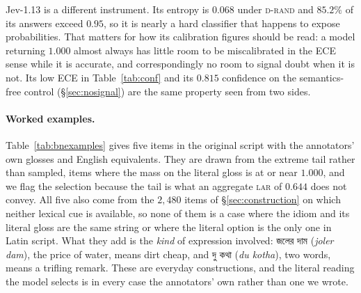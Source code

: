 \documentclass[11pt]{article}
\newcommand{\bangla}[1]{{\bn #1}}
\newcommand{\Drand}{\textsc{d-rand}}
\newcommand{\LAR}{\textsc{lar}}
\begin{document}
Jev-1.13 is a different instrument. Its entropy is $0.068$ under \Drand{} and
$85.2\%$ of its answers exceed $0.95$, so it is nearly a hard classifier that
happens to expose probabilities. That matters for how its calibration figures
should be read: a model returning $1.000$ almost always has little room to be
miscalibrated in the ECE sense while it is accurate, and correspondingly no room
to signal doubt when it is not. Its low ECE in Table~\ref{tab:conf} and its $0.815$
confidence on the semantics-free control (\S\ref{sec:nosignal}) are the same
property seen from two sides.

\paragraph{Worked examples.} Table~\ref{tab:bnexamples} gives five items in the
original script with the annotators' own glosses and English equivalents. They are
drawn from the extreme tail rather than sampled, items where the mass on the
literal gloss is at or near $1.000$, and we flag the selection because the tail is
what an aggregate \LAR{} of $0.644$ does not convey. All five also come from the
$2{,}480$ items of \S\ref{sec:construction} on which neither lexical cue is
available, so none of them is a case where the idiom and its literal gloss are
the same string or where the literal option is the only one in Latin script. What
they add is the \emph{kind} of expression involved: \bangla{জলের দাম}
(\emph{joler dam}), the price of water, means dirt cheap, and \bangla{দু কথা}
(\emph{du kotha}), two words, means a trifling remark. These are everyday
constructions, and the literal reading the model selects is in every case the
annotators' own rather than one we wrote.

\end{document}
